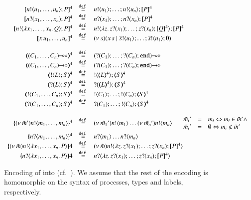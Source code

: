 \begin{figure}[t]
	\[
		\begin{array}{rcl}
			\pmap{\bout{n}{u_1, \dots, u_n} P}{4} &\defeq& \bout{n}{u_1} \dots ; \bout{n}{u_n} \pmap{P}{4}
			\\
			\pmap{\binp{n}{x_1, \dots, x_n} P}{4} &\defeq& \binp{n}{x_1} \dots ; \binp{n}{x_n} \pmap{P}{4}
			\\
			\pmap{\bout{n}{\abs{x_1, \dots, x_n}{Q}} P}{4} &\defeq& \bout{n}{\abs{z}{\binp{z}{x_1} \dots; \binp{z}{x_n} \pmap{Q}{4}}} \pmap{P}{4}
			\\
			\pmap{\appl{x}{u_1, \dots, u_n}}{4} &\defeq& \newsp{s}{\appl{x}{s} \Par \bout{\dual{s}}{u_1} \dots; \bout{\dual{s}}{u_1} \inact}
			\\
			\\
			\tmap{\lhot{(C_1, \dots, C_n)}}{4} &\defeq& \lhot{(\btinp{C_1} \dots; \btinp{C_n} \tinact)}
			\\
			\tmap{\shot{(C_1, \dots, C_n)}}{4} &\defeq& \shot{(\btinp{C_1} \dots; \btinp{C_n} \tinact)}
			\\
			\tmap{\btout{L} S}{4} &\defeq& \btout{\tmap{L}{4}} \tmap{S}{4}
			\\
			\tmap{\btinp{L} S}{4} &\defeq& \btinp{\tmap{L}{4}} \tmap{S}{4}
			\\
			\tmap{\btout{C_1, \dots, C_n} S}{4} &\defeq& \btout{C_1} \dots; \btout{C_n} \tmap{S}{4}
			\\
			\tmap{\btinp{C_1, \dots, C_n} S}{4} &\defeq& \btinp{C_1} \dots; \btout{C_n} \tmap{S}{4}
			\\
			\\
			\mapa{\news{\tilde{m}'} \bactout{n}{m_1, \dots, m_n}}^{4} &\defeq& \news{\tilde{m_1}'} \bactout{n}{m_1} \dots \news{\tilde{m_n}'}\bactout{n}{m_n}
			\quad \left.
			\begin{array}{rcl}
				\tilde{m_i}' &=& m_i \Leftrightarrow m_i \in \tilde{m}' \wedge\\
				\tilde{m_i}' &=& \es \Leftrightarrow m_i \notin \tilde{m}'
			\end{array}
			\right.
			\\
			\mapa{\bactinp{n}{m_1, \dots, m_n}}^{4} &\defeq& \bactinp{n}{m_1} \dots \bactinp{n}{m_n}
			\\
			\mapa{\news{\tilde{m}} \bactout{n}{\abs{x_1, \dots, x_n}{P}}}{4} &\defeq& \news{\tilde{m}} \bactout{n}{\abs{z}{\binp{z}{x_1} \dots; \binp{z}{x_n} \pmap{P}{4}}}
			\\
			\mapa{\bactinp{n}{\abs{x_1, \dots, x_n}{P}}}{4} &\defeq& \bactinp{n}{\abs{z}{\binp{z}{x_1} \dots; \binp{z}{x_n} \pmap{P}{4}}}
		\end{array}
	\]
%
	\caption{Encoding of \pHOp into \HOp (cf.~).
	We assume that the rest of the encoding is homomorphic on the syntax of
	processes, types and labels, respectively. \label{fig:enc:pHOp_to_HOp}}
\end{figure}

